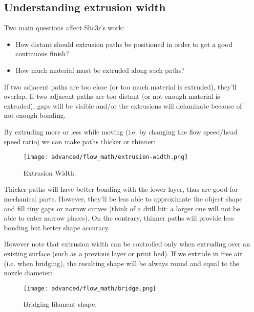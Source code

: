 
\subsection{Understanding extrusion width}
\label{sec:understanding_extrusion_width}

Two main questions affect Slic3r's work:
\begin{itemize}
\item How distant should extrusion paths be positioned in order to get a good continuous finish?
\item How much material must be extruded along such paths?
\end{itemize}

If two adjacent paths are too close (or too much material is extruded), they'll overlap. If two adjacent paths are too distant (or not enough material is extruded), gaps will be visible and/or the extrusions will delaminate because of not enough bonding.

By extruding more or less while moving (i.e. by changing the flow speed/head speed ratio) we can make paths thicker or thinner:

\begin{figure}[H]
\centering
\texttt{[image: advanced/flow\_math/extrusion-width.png]}
\caption{Extrusion Width.}
\label{fig:extrusion-width}
\end{figure}

Thicker paths will have better bonding with the lower layer, thus are good for mechanical parts. However, they'll be less able to approximate the object shape and fill tiny gaps or narrow curves (think of a drill bit: a larger one will not be able to enter narrow places). On the contrary, thinner paths will provide less bonding but better shape accuracy.

However note that extrusion width can be controlled only when extruding over an existing surface (such as a previous layer or print bed). If we extrude in free air (i.e. when bridging), the resulting shape will be always round and equal to the nozzle diameter:

\begin{figure}[H]
\centering
\texttt{[image: advanced/flow\_math/bridge.png]}
\caption{Bridging filament shape.}
\label{fig:bridge}
\end{figure}

